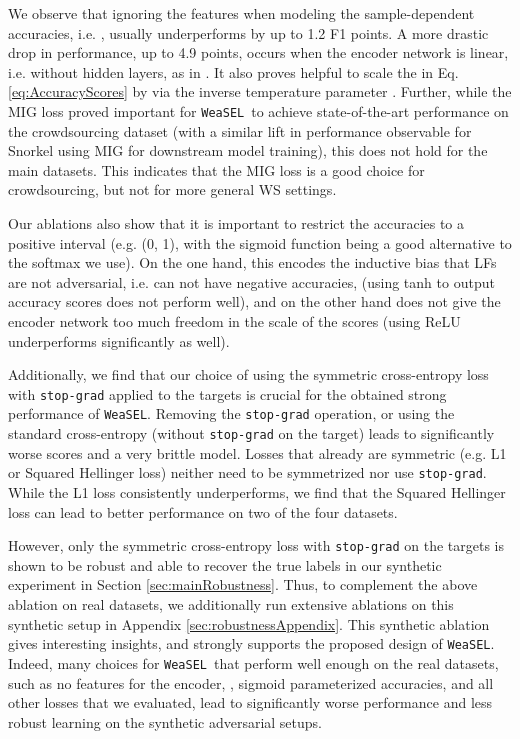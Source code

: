 \documentclass{article}
\newcommand{\weasel}{\texttt{WeaSEL}}\newcommand{\brackets}[1]{\left( #1 \right)}
\begin{document}
We observe that ignoring the features when modeling the sample-dependent accuracies, i.e. , usually underperforms by up to 1.2 F1 points.
A more drastic drop in performance, up to 4.9 points, occurs when the encoder network is linear, i.e. without hidden layers, as in \cite{MaxMIG}.
It also proves helpful to scale the  in Eq. \ref{eq:AccuracyScores} by  via the inverse temperature parameter . Further, while the MIG loss proved important for \weasel\ to achieve state-of-the-art performance on the crowdsourcing dataset (with a similar lift in performance observable for Snorkel using MIG for downstream model training), this does not hold for the main datasets. This indicates that the MIG loss is a good choice for crowdsourcing, but not for more general WS settings.  


Our ablations also show that it is important to restrict the accuracies to a positive interval (e.g. (0, 1), with the sigmoid function being a good alternative to the softmax we use). On the one hand, this encodes the inductive bias that LFs are not adversarial, i.e. can not have negative accuracies, (using tanh to output accuracy scores does not perform well), and on the other hand does not give the encoder network too much freedom in the scale of the scores (using ReLU underperforms significantly as well). 

Additionally, we find that our choice of using the symmetric cross-entropy loss with \texttt{stop-grad} applied to the targets is  crucial for the obtained strong performance of \weasel. Removing the \texttt{stop-grad} operation, or using the standard cross-entropy (without \texttt{stop-grad} on the target) leads to significantly worse scores and a very brittle model.
Losses that already are symmetric (e.g. L1 or Squared Hellinger loss) neither need to be symmetrized nor use \texttt{stop-grad}. While the L1 loss consistently underperforms, we find that the Squared Hellinger loss can lead to better performance on two of the four datasets.

However, only the symmetric cross-entropy loss with \texttt{stop-grad} on the targets is shown to be robust and able to recover the true labels in our synthetic experiment in Section \ref{sec:mainRobustness}. Thus, to complement the above ablation on real datasets, we additionally run extensive ablations on this synthetic setup in Appendix \ref{sec:robustnessAppendix}. This synthetic ablation gives interesting insights, and strongly supports the proposed design of \weasel. Indeed, many choices for \weasel\ that perform well enough on the real datasets, such as no features for the encoder, , sigmoid parameterized accuracies, and all other losses that we evaluated, lead to significantly worse performance and less robust learning on the synthetic adversarial setups.
\end{document}
